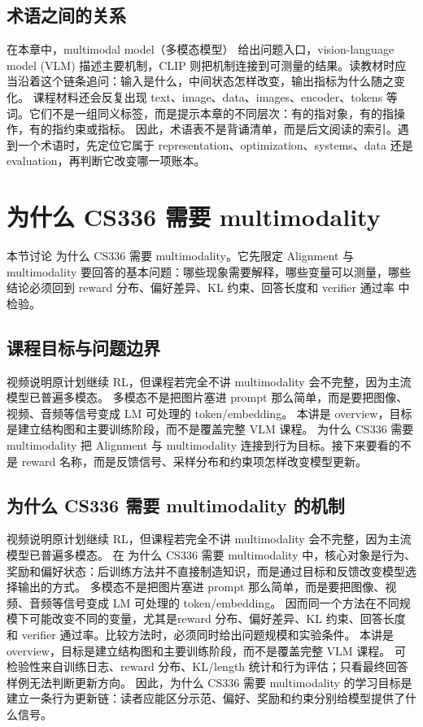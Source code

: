 \documentclass[a4paper]{article}
\begin{document}
\subsection{术语之间的关系}
在本章中，multimodal model（多模态模型） 给出问题入口，vision-language model (VLM) 描述主要机制，CLIP 则把机制连接到可测量的结果。读教材时应当沿着这个链条追问：输入是什么，中间状态怎样改变，输出指标为什么随之变化。
课程材料还会反复出现 text、image、data、images、encoder、tokens 等词。它们不是一组同义标签，而是提示本章的不同层次：有的指对象，有的指操作，有的指约束或指标。
因此，术语表不是背诵清单，而是后文阅读的索引。遇到一个术语时，先定位它属于 representation、optimization、systems、data 还是 evaluation，再判断它改变哪一项账本。
\section{为什么 CS336 需要 multimodality}
本节讨论 为什么 CS336 需要 multimodality。它先限定 Alignment 与 multimodality 要回答的基本问题：哪些现象需要解释，哪些变量可以测量，哪些结论必须回到 reward 分布、偏好差异、KL 约束、回答长度和 verifier 通过率 中检验。
\subsection{课程目标与问题边界}
视频说明原计划继续 RL，但课程若完全不讲 multimodality 会不完整，因为主流模型已普遍多模态。
多模态不是把图片塞进 prompt 那么简单，而是要把图像、视频、音频等信号变成 LM 可处理的 token/embedding。
本讲是 overview，目标是建立结构图和主要训练阶段，而不是覆盖完整 VLM 课程。
为什么 CS336 需要 multimodality 把 Alignment 与 multimodality 连接到行为目标。接下来要看的不是 reward 名称，而是反馈信号、采样分布和约束项怎样改变模型更新。
\subsection{为什么 CS336 需要 multimodality 的机制}
视频说明原计划继续 RL，但课程若完全不讲 multimodality 会不完整，因为主流模型已普遍多模态。 在 为什么 CS336 需要 multimodality 中，核心对象是行为、奖励和偏好状态：后训练方法并不直接制造知识，而是通过目标和反馈改变模型选择输出的方式。
多模态不是把图片塞进 prompt 那么简单，而是要把图像、视频、音频等信号变成 LM 可处理的 token/embedding。 因而同一个方法在不同规模下可能改变不同的变量，尤其是reward 分布、偏好差异、KL 约束、回答长度和 verifier 通过率。比较方法时，必须同时给出问题规模和实验条件。
本讲是 overview，目标是建立结构图和主要训练阶段，而不是覆盖完整 VLM 课程。 可检验性来自训练日志、reward 分布、KL/length 统计和行为评估；只看最终回答样例无法判断更新方向。
因此，为什么 CS336 需要 multimodality 的学习目标是建立一条行为更新链：读者应能区分示范、偏好、奖励和约束分别给模型提供了什么信号。
\end{document}
